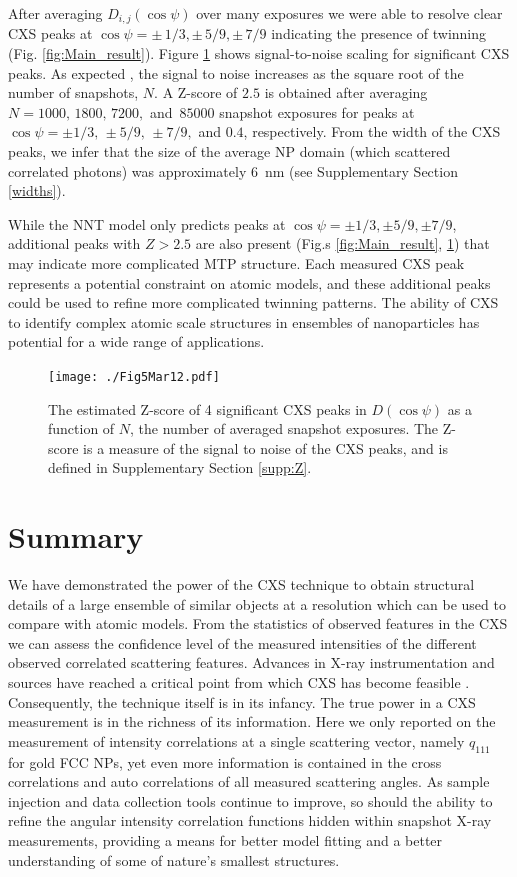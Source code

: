 \documentclass [12pt,fleqn]{article}
\begin{document}
After averaging $D_{i,j}(\cos \psi)$ over many exposures we were able to resolve clear CXS peaks at $\cos \psi = \pm\,  1/3, \pm\, 5/9, \pm\, 7/9$ indicating the presence of twinning (Fig. \ref{fig:Main_result}). Figure \ref{fig:pk} shows signal-to-noise scaling for significant CXS peaks. As expected \cite{kirian2011signal}, the signal to noise increases as the square root of the number of snapshots, $N$. A Z-score of $2.5$ is obtained after averaging $N=1000,\,1800,\,7200,$ and $\,85000$ snapshot exposures for peaks at $\cos \psi = \pm 1/3,\, \pm 5/9,\, \pm 7/9,$ and $0.4$, respectively. From the width of the CXS peaks, we infer that the size of the average NP domain (which scattered correlated photons) was approximately \SI{6}{\nano \meter} (see Supplementary Section \ref{widths}).
 
While the NNT model only predicts peaks at $\cos \psi = \pm1/3, \pm 5/9, \pm 7/9$, additional peaks with $Z > 2.5$ are also present (Fig.s \ref{fig:Main_result}, \ref{fig:pk}) that may indicate more complicated MTP structure. Each measured CXS peak represents a potential constraint on atomic models, and these additional peaks could be used to refine more complicated twinning patterns. The ability of CXS to identify complex atomic scale structures in ensembles of nanoparticles has potential for a wide range of applications. 
 
\begin{figure}[H]
\texttt{[image: ./Fig5Mar12.pdf]}
\caption{The estimated Z-score of 4 significant CXS peaks in $D(\cos \psi)$ as a function of $N$, the number of averaged snapshot exposures. The Z-score is a measure of the signal to noise of the CXS peaks, and is defined in Supplementary Section \ref{supp:Z}.}
\label{fig:pk}
\end{figure}

\section{Summary}
We have demonstrated the power of the CXS technique to obtain structural details of a large ensemble of similar objects at a resolution which can be used to compare with atomic models. From the statistics of observed features in the CXS we can assess the confidence level of the measured intensities of the different observed correlated scattering  features. Advances in X-ray instrumentation and sources have reached a critical point from which CXS has become feasible \cite{emma2010first, ishikawa2012compact}. Consequently, the technique itself is in its infancy. The true power in a CXS measurement is in the richness of its information. Here we only reported on the measurement of intensity correlations at a single scattering vector, namely $q_{111}$ for gold FCC NPs, yet even more information is contained in the cross correlations and auto correlations of all measured scattering angles. As sample injection and data collection tools continue to improve, so should the ability to refine the angular intensity correlation functions hidden within snapshot X-ray measurements, providing a means for better model fitting and a better understanding of some of nature's smallest structures.
\end{document}
